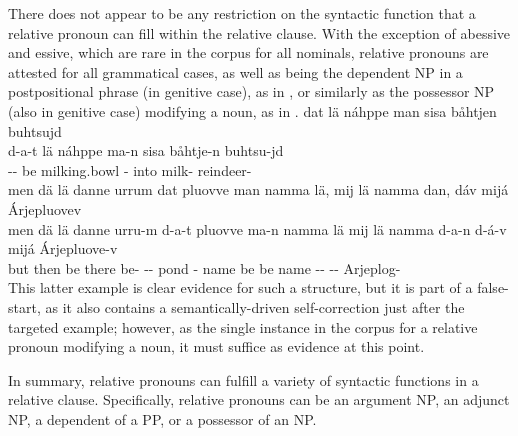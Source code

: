 There does not appear to be any restriction on the syntactic function that a relative pronoun can fill within the relative clause. With the exception of abessive and essive, which are rare in the corpus for all nominals, relative pronouns are attested for all grammatical cases, as well as being the dependent NP in a postpositional phrase (in genitive case), as in , or similarly as the possessor NP (also in genitive case) modifying a noun, as in . 
\ea\label{relClause7}%
\glll	dat lä náhppe man sisa båhtjen buhtsujd\\
	d-a-t lä náhppe ma-n sisa båhtje-n buhtsu-jd\\
	-- be\BS{} milking.bowl\BS{} - into milk- reindeer-\\\nopagebreak
{} 
\z
\ea\label{relClause8}%
\glll	men dä lä danne urrum dat pluovve man namma lä, mij lä namma dan, dáv mijá Árjepluovev\\
	men dä lä danne urru-m d-a-t pluovve ma-n namma lä mij lä namma d-a-n d-á-v mijá Árjepluove-v\\
	but then be\BS{} there be- -- pond\BS{} - name\BS{} be\BS{} \BS{} be\BS{} name\BS{} -- --  Arjeplog-\\\nopagebreak
{} 
\z
This latter example is clear evidence for such a structure, but it is part of a false-start, as it also contains a semantically-driven self-correction just after the targeted example; however, as the single instance in the corpus for a relative pronoun modifying a noun, it must suffice as evidence at this point. %


In summary, relative pronouns can fulfill a variety of syntactic functions in a relative clause. Specifically, relative pronouns can be  
an argument NP, 
an adjunct NP, 
a dependent of a PP, or 
a possessor of an NP.


%
